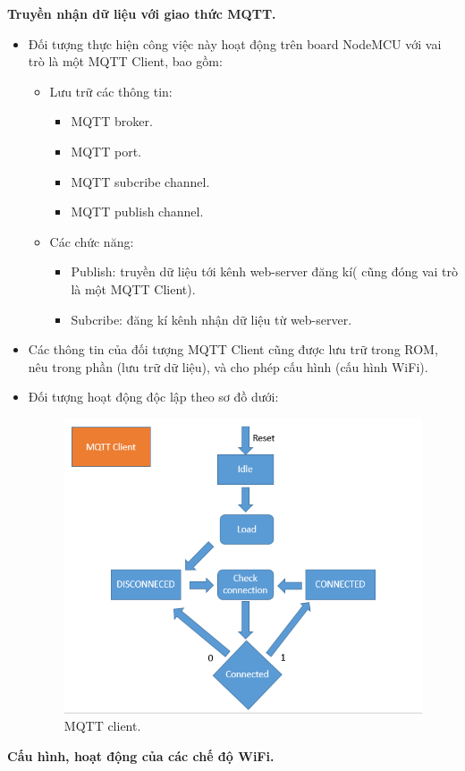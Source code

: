 \documentclass[a4paper,12pt,oneside]{article}
\begin{document}
\noindent \textbf{Truyền nhận dữ liệu với giao thức MQTT.}
	\begin{itemize}
	\item Đối tượng thực hiện công việc này hoạt động trên board NodeMCU với vai trò là một MQTT Client, bao gồm:
		\begin{itemize}
		\item Lưu trữ các thông tin:
			\begin{itemize}
			\item	MQTT broker.
			\item	MQTT port.
			\item	MQTT subcribe channel.
			\item	MQTT publish channel.
			\end{itemize}
		\item	Các chức năng:
			\begin{itemize}
				\item Publish: truyền dữ liệu tới kênh web-server đăng kí( cũng đóng vai trò là một MQTT Client).
				\item	Subcribe: đăng kí kênh nhận dữ liệu từ web-server.
			\end{itemize}

		\end{itemize}
		\item Các thông tin của đối tượng MQTT Client cũng được lưu trữ trong ROM, nêu trong phần (lưu trữ dữ liệu), và cho phép cấu hình (cấu hình WiFi).
		\item Đối tượng hoạt động độc lập theo sơ đồ dưới:
		
			\begin{center}
			\begin{figure}[h!]
			\begin{center}
			\includegraphics[scale=.6]{hinh/mqtt_client.PNG}
			\end{center}
			\caption{MQTT client.}
			\end{figure}
			\end{center}
	\end{itemize}
\noindent	\textbf{Cấu hình, hoạt động của các chế độ WiFi.}
\end{document}

